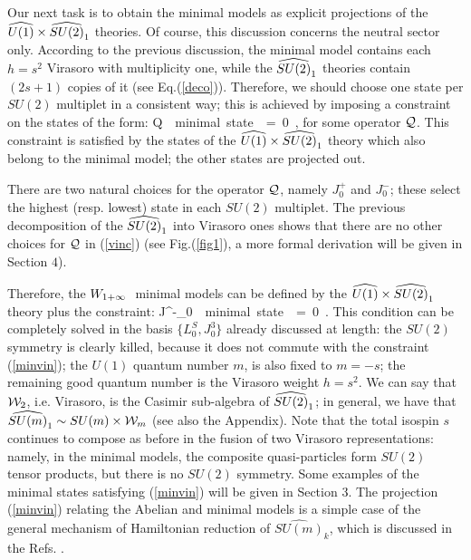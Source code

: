 Our next task is to obtain the minimal models as
explicit projections of the $\u1\times\su2$ theories.
Of course, this discussion concerns the neutral sector only.
According to the previous discussion, the minimal model
contains each $h=s^2$ Virasoro \rep with multiplicity one,
while the $\su2$ theories contain $(2s+1)$ copies of it
(see Eq.(\ref{deco})). Therefore, we should choose one 
state per $SU(2)$ multiplet in a consistent way;
this is achieved by imposing a constraint on the states of the form:
\beq
{\cal Q}\ \vert\ {\rm minimal\ state}\ \rangle\ =\ 0\ ,
\label{vinc}
\eeq
for some operator ${\cal Q}$. This constraint is satisfied by 
the states of the $\u1\times\su2$ theory which also
belong to the minimal model; the other states are
projected out.

There are two natural choices for the operator ${\cal Q}$,
namely $J^+_0$ and $J^-_0$; these select the highest
(resp. lowest) state in each $SU(2)$ multiplet.
The previous decomposition of the $\su2$ \reps
into Virasoro ones shows that there are no other choices 
for ${\cal Q}$ in (\ref{vinc}) (see Fig.(\ref{fig1}), 
a more formal derivation will be given in Section $4$).

Therefore, the $W_{1+\infty}\ $ minimal models can be
defined by the $\u1\times\su2$ theory plus the constraint:
\beq
J^-_0\ \vert\ {\rm minimal\ state}\ \rangle\ =\ 0\ .
\label{minvin}
\eeq
This condition can be completely solved in the basis
$\{ L^S_0, J^3_0 \}$ already discussed at length:
the $SU(2)$ symmetry is clearly killed, because it does not commute 
with the constraint (\ref{minvin}); 
the $U(1)$ quantum number $m$, is also fixed to $m=-s$; 
the remaining good quantum number is the Virasoro weight $h=s^2$.
We can say that ${\cal W}_2$, i.e. Virasoro, is the Casimir sub-algebra
of $\su2$; in general, we have that $\widehat{SU(m)}_1 \sim SU(m) \times {\cal W}_m$
(see also the Appendix).
Note that the total isospin $s$ continues to compose as before in 
the fusion of two Virasoro representations: namely, in the minimal models,
the composite quasi-particles form $SU(2)$ tensor products,
but there is no $SU(2)$ symmetry.
Some examples of the minimal states satisfying (\ref{minvin})
will be given in Section 3.
The projection (\ref{minvin}) relating the Abelian and minimal
models is a simple case of the general mechanism of 
Hamiltonian reduction of $\widehat{SU(m)}_k$, which is
discussed in the Refs. \cite{hamred}.




